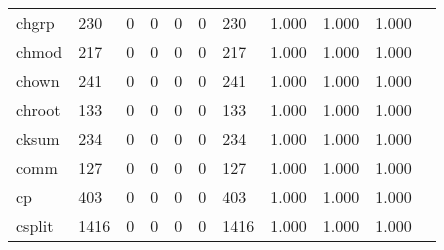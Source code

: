 \begin{longtable}{lp{1.10cm}p{1.10cm}p{1.10cm}p{1.10cm}p{1.10cm}p{1.10cm}p{1.10cm}p{1.10cm}p{1.10cm}p{1.10cm}}
chgrp     &                    230 &                                  0 &                                 0 &                                0 &                                 0 &                             230 &                          1.000 &                                 1.000 &                               1.000 \\
chmod     &                    217 &                                  0 &                                 0 &                                0 &                                 0 &                             217 &                          1.000 &                                 1.000 &                               1.000 \\
chown     &                    241 &                                  0 &                                 0 &                                0 &                                 0 &                             241 &                          1.000 &                                 1.000 &                               1.000 \\
chroot    &                    133 &                                  0 &                                 0 &                                0 &                                 0 &                             133 &                          1.000 &                                 1.000 &                               1.000 \\
cksum     &                    234 &                                  0 &                                 0 &                                0 &                                 0 &                             234 &                          1.000 &                                 1.000 &                               1.000 \\
comm      &                    127 &                                  0 &                                 0 &                                0 &                                 0 &                             127 &                          1.000 &                                 1.000 &                               1.000 \\
cp        &                    403 &                                  0 &                                 0 &                                0 &                                 0 &                             403 &                          1.000 &                                 1.000 &                               1.000 \\
csplit    &                   1416 &                                  0 &                                 0 &                                0 &                                 0 &                            1416 &                          1.000 &                                 1.000 &                               1.000 \\

\end{longtable}
